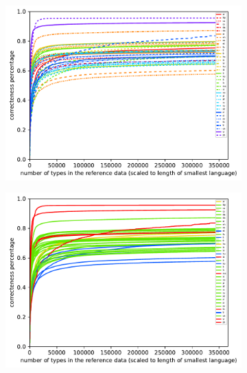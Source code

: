 \documentclass[11pt,a4paper,twoside,openright]{scrbook}
\begin{document}
\begin{figure}[h]
    \centering
    \begin{subfigure}[b]{0.32\textwidth}
    	\centering
        \includegraphics[width=\textwidth]{graphs/rnn/norm_huge_type_token_performance}
    \end{subfigure}
    \begin{subfigure}[b]{0.32\textwidth}
    	\centering
        \includegraphics[width=\textwidth]{graphs/rnn/morph_types/norm_huge_type_token_performance}
    \end{subfigure}
    \begin{subfigure}[b]{0.32\textwidth}
    	\centering

\end{subfigure}
\end{figure}
\end{document}
